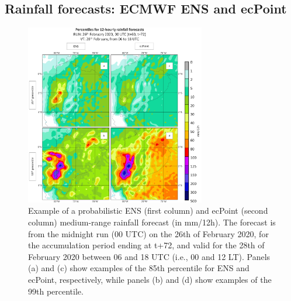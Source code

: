 \documentclass[techmemo]{ecmwfrep}%
\begin{document}
\subsection{Rainfall forecasts: ECMWF ENS and ecPoint}
\label{sec:Data_RainFC}

\begin{figure}
\centering
\includegraphics[width=0.7\textwidth]{Figures/05_DATA_Percentiles.png}
\caption{Example of a probabilistic ENS (first column) and ecPoint (second column) medium-range rainfall forecast (in mm/12h). The forecast is from the midnight run (00 UTC) on the 26th of February 2020, for the accumulation period ending at t+72, and valid for the 28th of February 2020 between 06 and 18 UTC (i.e., 00 and 12 LT). Panels (a) and (c) show examples of the 85th percentile for ENS and ecPoint, respectively, while panels (b) and (d) show examples of the 99th percentile.}
\label{fig:Percentiles}
\end{figure}
\end{document}
